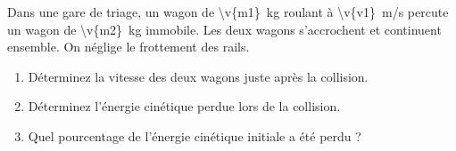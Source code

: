 Dans une gare de triage, un wagon de \qty{\v{m1}}{kg} roulant à \qty{\v{v1}}{m/s} percute un wagon de \qty{\v{m2}}{kg} immobile. Les deux wagons s'accrochent et continuent ensemble. On néglige le frottement des rails.

\begin{enumerate}[label=\alph*)]
    \item Déterminez la vitesse des deux wagons juste après la collision.
    \item Déterminez l'énergie cinétique perdue lors de la collision.
    \item Quel pourcentage de l'énergie cinétique initiale a été perdu ?
\end{enumerate}
